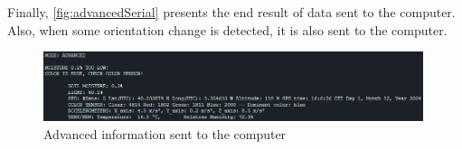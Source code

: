 Finally, \autoref{fig:advancedSerial} presents the end result of data sent to the computer. Also, when some orientation change is detected, it is also sent to the computer.
\begin{figure}[H]
    \centering
    \includegraphics[width=0.99\textwidth]{images/5/AdvancedSerial.png}
    \caption{Advanced information sent to the computer}
    \label{fig:advancedSerial}
\end{figure}
